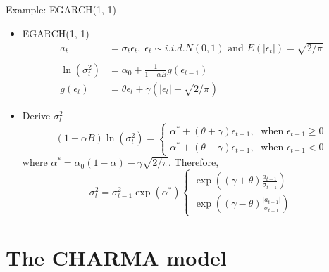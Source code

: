 \documentclass[presentation,10pt]{beamer}
\begin{document}
\begin{frame}[shrink,label={sec:org599b799}]{Example: EGARCH(1, 1)}
\begin{itemize}
\item EGARCH(1, 1)
\begin{align*}
a_t &= \sigma_t \epsilon_t,\; \epsilon_t \sim i.i.d. N(0, 1) \text{ and } E(|\epsilon_t|) = \sqrt{2/\pi} \\ \\
\ln(\sigma^2_t)&= \alpha_0 + \frac{1}{1 - \alpha B} g(\epsilon_{t-1}) \\
g(\epsilon_t) &= \theta \epsilon_t + \gamma \left( |\epsilon_t| - \sqrt{2/\pi} \right)
\end{align*}

\item Derive \(\sigma^2_t\)
\begin{equation*}
(1 - \alpha B) \ln(\sigma^2_t) = 
\begin{cases}
\alpha^{*} + (\theta + \gamma) \epsilon_{t-1},\; \text{ when } \epsilon_{t-1} \geq 0 \\
\alpha^{*} + (\theta - \gamma) \epsilon_{t-1},\; \text{ when } \epsilon_{t-1} < 0
\end{cases}
\end{equation*}
where \(\alpha^{*} = \alpha_0(1 - \alpha) - \gamma
  \sqrt{2/\pi}\). Therefore, 
\begin{equation*}
\sigma^2_t = \sigma^2_{t-1} \exp(\alpha^{*}) 
\begin{cases}
\exp \left( (\gamma+\theta) \frac{a_{t-1}}{\sigma_{t-1}} \right) \\
\exp \left( (\gamma-\theta) \frac{|a_{t-1}|}{\sigma_{t-1}} \right)
\end{cases}
\end{equation*}
\end{itemize}
\end{frame}

\section{The CHARMA model}
\label{sec:org5e505bb}
\end{document}

